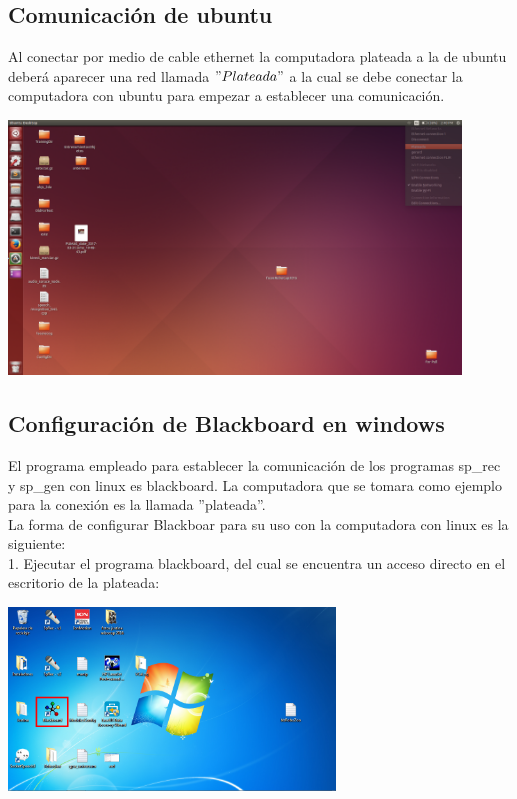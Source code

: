 \documentclass[user_manual.tex]{subfiles}
\begin{document}
\subsection{Comunicación de ubuntu}

Al conectar por medio de cable ethernet la computadora plateada a la de ubuntu deberá aparecer una red llamada $"Plateada"$ a la cual se debe conectar la computadora con ubuntu para empezar a establecer una comunicación.


\begin{center}
\includegraphics[width=0.9\textwidth]{Figures/Puesta_marcha/Red_plateada.png}
\end{center}



\subsection{Configuración de Blackboard en windows}

El programa empleado para establecer la comunicación de los programas sp\_rec y sp\_gen con linux es blackboard. La computadora que se tomara como ejemplo para la conexión es la llamada ''plateada''.\\

La forma de configurar Blackboar para su uso con la computadora con linux es la siguiente:\\

1. Ejecutar el programa blackboard, del cual se encuentra un acceso directo en el escritorio de la plateada:

\begin{center}
\includegraphics[width=0.65\textwidth]{Figures/Puesta_marcha/Abrir_Bb.png}
\end{center}
\end{document}
